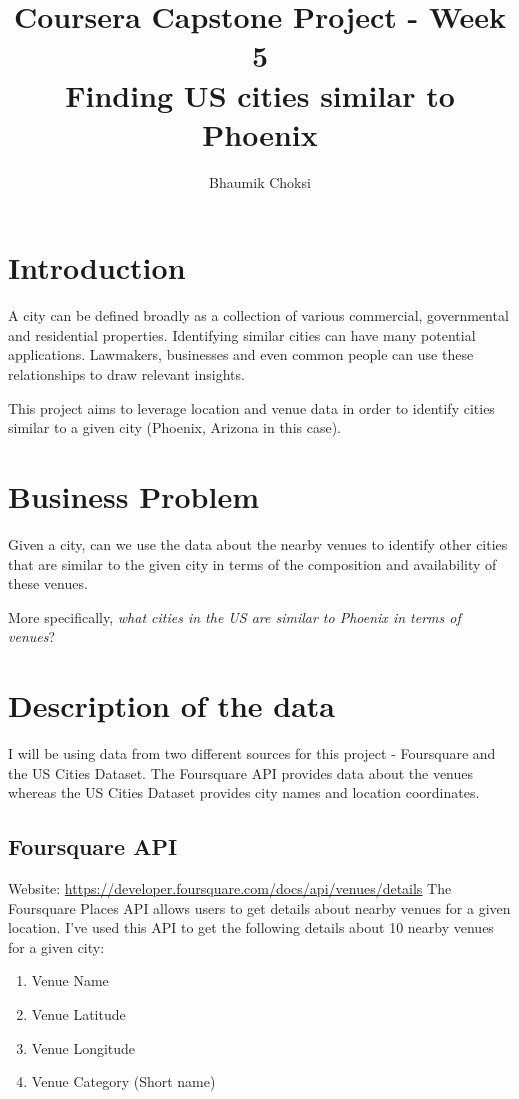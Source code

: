 \documentclass[12pt, a4paper]{report}
\title{Coursera Capstone Project - Week 5\\ \textbf{Finding US cities similar to Phoenix} }
\author{Bhaumik Choksi}
\begin{document}
	\maketitle
		
	\section*{Introduction}
	A city can be defined broadly as a collection of various commercial, governmental and residential properties. Identifying similar cities can have many potential applications. Lawmakers, businesses and even common people can use these relationships to draw relevant insights. 
	
	This project aims to leverage location and venue data in order to identify cities similar to a given city (Phoenix, Arizona in this case). 
	
	
	\section*{Business Problem}
	Given a city, can we use the data about the nearby venues to identify other cities that are similar to the given city in terms of the composition and availability of these venues.
	
	More specifically, \textit{what cities in the US are similar to Phoenix in terms of venues}? 

\newpage

\section*{Description of the data}
I will be using data from two different sources for this project - Foursquare and the US Cities Dataset. The Foursquare API provides data about the venues whereas the US Cities Dataset provides city names and location coordinates. 

\subsection*{Foursquare API}
Website: \href{https://developer.foursquare.com/docs/api/venues/details}{https://developer.foursquare.com/docs/api/venues/details}
\newline
The Foursquare Places API allows users to get details about nearby venues for a given location. I've used this API to get the following details about 10 nearby venues for a given city:
\begin{enumerate}
	\item Venue Name
	\item Venue Latitude
	\item Venue Longitude
	\item Venue Category (Short name)
\end{enumerate}
\end{document}
